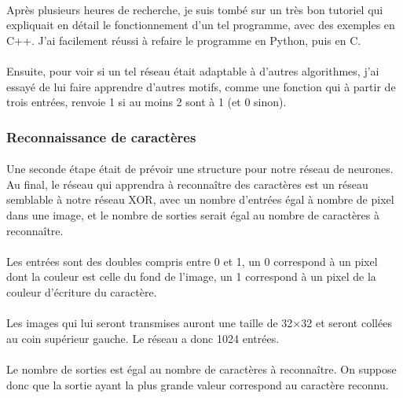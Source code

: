 \documentclass{article}
\begin{document}
\paragraph{}Après plusieurs heures de recherche, je suis tombé sur un très bon tutoriel qui expliquait en détail le fonctionnement d'un tel programme, avec des exemples en C++. J'ai facilement réussi à refaire le programme en Python, puis en C.

\paragraph{}Ensuite, pour voir si un tel réseau était adaptable à d'autres algorithmes, j'ai essayé de lui faire apprendre d'autres motifs, comme une fonction qui à partir de trois entrées, renvoie 1 si au moins 2 sont à 1 (et 0 sinon).

\subsubsection{Reconnaissance de caractères}

\paragraph{}Une seconde étape était de prévoir une structure pour notre réseau de neurones.
Au final, le réseau qui apprendra à reconnaître des caractères est un réseau semblable à notre réseau XOR, avec un nombre d'entrées égal à nombre de pixel dans une image, et le nombre de sorties serait égal au nombre de caractères à reconnaître.

\paragraph{}Les entrées sont des doubles compris entre 0 et 1, un 0 correspond à un pixel dont la couleur est celle du fond de l'image, un 1 correspond à un pixel de la couleur d'écriture du caractère.

\paragraph{}Les images qui lui seront transmises auront une taille de 32$\times$32 et seront collées au coin supérieur gauche. Le réseau a donc 1024 entrées.

\paragraph{}Le nombre de sorties est égal au nombre de caractères à reconnaître. On suppose donc que la sortie ayant la plus grande valeur correspond au caractère reconnu.
\end{document}
